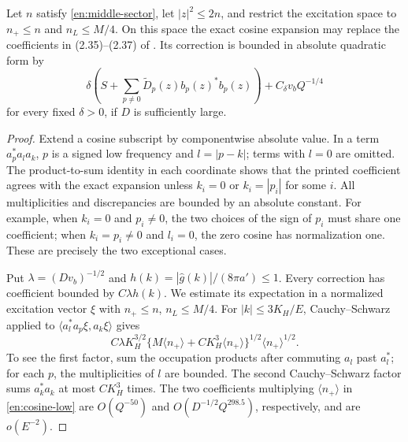\begin{lemma}\label{en:cosine-correction}
Let $n$ satisfy \eqref{en:middle-sector}, let $|z|^2\le2n$, and restrict
the excitation space to $n_+\le n$ and $n_L\le M/4$.  On this space the
exact cosine expansion may replace the coefficients in (2.35)--(2.37)
of \cite{FJGMOT}.  Its correction is bounded in absolute quadratic form by
\[
 \delta\left(S+\sum_{p\ne0}\widetilde D_p(z)b_p(z)^*b_p(z)\right)
       +C_\delta v_bQ^{-1/4}
\]
for every fixed $\delta>0$, if $D$ is sufficiently large.
\end{lemma}

\begin{proof}
Extend a cosine subscript by componentwise absolute value.  In a term
$a_p^*a_l a_k$, $p$ is a signed low frequency and $l=|p-k|$; terms with
$l=0$ are omitted.  The product-to-sum identity in each coordinate shows
that the printed coefficient agrees with the exact expansion unless
$k_i=0$ or $k_i=|p_i|$ for some $i$.  All multiplicities and discrepancies
are bounded by an absolute constant.  For example, when $k_i=0$ and
$p_i\ne0$, the two choices of the sign of $p_i$ must share one coefficient;
when $k_i=p_i\ne0$ and $l_i=0$, the zero cosine has normalization one.
These are precisely the two exceptional cases.

Put $\lambda=(Dv_b)^{-1/2}$ and
$h(k)=|\widehat g(k)|/(8\pi a')\le1$.  Every correction has coefficient
bounded by $C\lambda h(k)$.  We estimate its expectation in a normalized
excitation vector $\xi$ with $n_+\le n$, $n_L\le M/4$.
For $|k|\le3K_H/E$, Cauchy--Schwarz applied to
$\langle a_l^*a_p\xi,a_k\xi\rangle$ gives
\begin{equation}\label{en:cosine-low}
 C\lambda K_H^{3/2}
       \{M\langle n_+\rangle+CK_H^3\langle n_+\rangle\}^{1/2}
       \langle n_+\rangle^{1/2}.
\end{equation}
To see the first factor, sum the occupation products after commuting
$a_l$ past $a_l^*$; for each $p$, the multiplicities of $l$ are bounded.
The second Cauchy--Schwarz factor sums $a_k^*a_k$ at most $CK_H^3$
times.  The two coefficients multiplying $\langle n_+\rangle$ in
\eqref{en:cosine-low} are $O(Q^{-50})$ and
$O(D^{-1/2}Q^{298.5})$, respectively, and are $o(E^{-2})$.


\end{proof}
